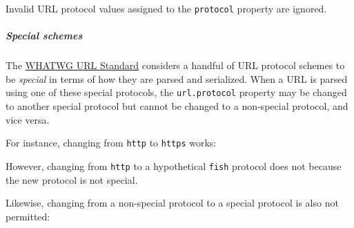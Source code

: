 Invalid URL protocol values assigned to the \texttt{protocol} property
are ignored.

\subparagraph{Special schemes}\label{special-schemes}

The \href{https://url.spec.whatwg.org/}{WHATWG URL Standard} considers a
handful of URL protocol schemes to be \emph{special} in terms of how
they are parsed and serialized. When a URL is parsed using one of these
special protocols, the \texttt{url.protocol} property may be changed to
another special protocol but cannot be changed to a non-special
protocol, and vice versa.

For instance, changing from \texttt{http} to \texttt{https} works:

\begin{Shaded}
\begin{Highlighting}[]
\OperatorTok{=}  \NormalTok{(}\NormalTok{)}\OperatorTok{;}
 \OperatorTok{=} \OperatorTok{;}
\NormalTok{)}\OperatorTok{;}
\end{Highlighting}
\end{Shaded}

However, changing from \texttt{http} to a hypothetical \texttt{fish}
protocol does not because the new protocol is not special.

\begin{Shaded}
\begin{Highlighting}[]
\OperatorTok{=}  \NormalTok{(}\NormalTok{)}\OperatorTok{;}
 \OperatorTok{=} \OperatorTok{;}
\NormalTok{)}\OperatorTok{;}
\end{Highlighting}
\end{Shaded}

Likewise, changing from a non-special protocol to a special protocol is
also not permitted:

\begin{Shaded}
\begin{Highlighting}[]
\OperatorTok{=}  \NormalTok{(}\NormalTok{)}\OperatorTok{;}
 \OperatorTok{=} \OperatorTok{;}
\NormalTok{)}\OperatorTok{;}
\end{Highlighting}
\end{Shaded}

